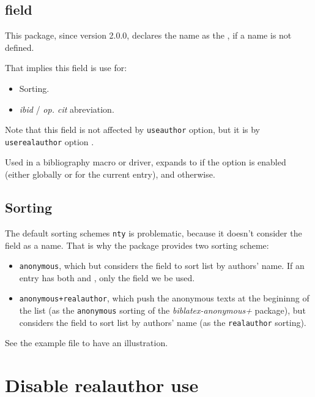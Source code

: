 \documentclass{ltxdockit}[2011/03/25]
\begin{document}
\subsection{ field}\label{field:label} 

This package, since version 2.0.0, declares  the  name as the , if a  name is not defined.

That implies this field is use for:
\begin{itemize}
  \item Sorting.
  \item \emph{ibid} / \emph{op. cit} abreviation.
\end{itemize}

Note that this field is not affected by \verb+useauthor+ option, but it is by \verb+userealauthor+ option .

Used in a bibliography macro or driver,  expands to  if the  option is enabled (either globally or for the current entry), and  otherwise.

\subsection{Sorting}\label{sorting}

The default sorting schemes \verb+nty+ is problematic, because it doesn't consider the  field  as a name. That is why the package provides two sorting scheme:

\begin{itemize}
   \item  \verb|anonymous|, which  but considers the  field to sort list by authors' name. If an entry has both  and , only the  field we be used.
  \item  \verb|anonymous+realauthor|, which push the anonymous texts at the begininng of the list (as the \verb+anonymous+ sorting of the \emph{biblatex-anonymous+} package), but considers the  field to sort list by authors' name (as the \verb+realauthor+ sorting).
\end{itemize} 
  See the example file to have an illustration.
  
\section{Disable realauthor use}\label{userealauthor}
\end{document}
